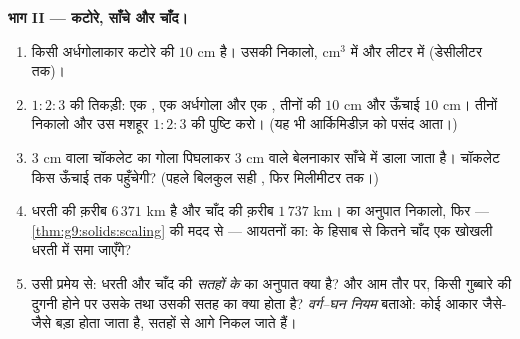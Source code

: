 \begin{problem}
\medskip
\noindent\textbf{भाग II --- कटोरे, साँचे और चाँद।}
\begin{enumerate}[resume]
  \item किसी अर्धगोलाकार कटोरे की  $10$ cm है। उसकी 
        निकालो, cm$^3$ में और लीटर में (डेसीलीटर तक)।
  \item $1:2:3$ की तिकड़ी: एक , एक अर्धगोला और एक , तीनों
        की  $10$ cm और ऊँचाई $10$ cm। तीनों  निकालो और
        उस मशहूर  $1 : 2 : 3$ की पुष्टि करो। (यह भी
        आर्किमिडीज़ को पसंद आता।)
  \item $3$ cm  वाला चॉकलेट का गोला पिघलाकर $3$ cm
         वाले बेलनाकार साँचे में डाला जाता है। चॉकलेट किस
        ऊँचाई तक पहुँचेगी? (पहले बिलकुल सही , फिर मिलीमीटर
        तक।)
  \item धरती की  क़रीब $6\,371$ km है और चाँद की क़रीब
        $1\,737$ km।  का अनुपात निकालो, फिर
        --- \cref{thm:g9:solids:scaling} की मदद से --- आयतनों का:
         के हिसाब से कितने चाँद एक खोखली धरती में समा जाएँगे?
  \item उसी प्रमेय से: धरती और चाँद की \emph{सतहों के }
        का अनुपात क्या है? और आम तौर पर, किसी गुब्बारे की 
        दुगनी होने पर उसके  तथा उसकी सतह का क्या होता है?
        \emph{वर्ग--घन नियम} बताओ: कोई आकार जैसे-जैसे बड़ा होता
        जाता है,  सतहों से आगे निकल जाते हैं।
\end{enumerate}


\end{problem}
